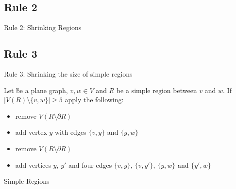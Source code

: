 \subsection{Rule 2}
\begin{frame}[c]{Rule 2: Shrinking Regions}
    \begin{figure}[!ht]
    \end{figure}
\end{frame}

\subsection{Rule 3}
\begin{frame}[c]{Rule 3: Shrinking the size of simple regions}

    Let \G be a plane graph, $v, w \in V$ and $R$ be a simple region between $v$ and $w$. If $|V(R) \setminus \{v, w\}| \geq 5$ apply the following:

    \begin{caseof}

            \begin{itemize}
                    \item remove $V(R\setminus\partial R)$
                    \item add vertex $y$ with edges $\{v, y\}$ and $\{y, w\}$
            \end{itemize}


            \begin{itemize}
                    \item remove $V(R\setminus\partial R)$
                    \item add vertices $y$, $y'$ and four edges $\{v,y\}$, $\{v, y'\}$, $\{y, w\}$ and $\{y', w\}$
            \end{itemize}
        \end{caseof}
\end{frame}

\begin{frame}[c]{Simple Regions}

\end{frame}

